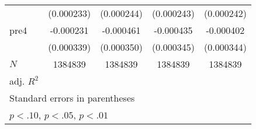 \begin{table}[htbp]
\begin{tabular}{l*{4}{c}}
            &  (0.000233)         &  (0.000244)         &  (0.000243)         &  (0.000242)         \\
[1em]
pre4        &   -0.000231         &   -0.000461         &   -0.000435         &   -0.000402         \\
            &  (0.000339)         &  (0.000350)         &  (0.000345)         &  (0.000344)         \\
\hline
\(N\)       &     1384839         &     1384839         &     1384839         &     1384839         \\
adj. \(R^{2}\)&                     &                     &                     &                     \\
\hline\hline
\multicolumn{5}{l}{\footnotesize Standard errors in parentheses}\\
\multicolumn{5}{l}{\footnotesize \sym{*} \(p<.10\), \sym{**} \(p<.05\), \sym{***} \(p<.01\)}\\
\end{tabular}
\end{table}
